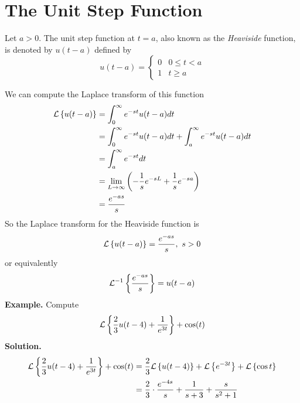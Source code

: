 \documentclass[openany]{report}
\begin{document}
\section{The Unit Step Function}

\begin{definition}
    Let $a > 0$. The unit step function at $t = a$, also known as the \emph{Heaviside} function, is denoted by $u(t-a)$ defined by 
    \[u(t-a) = \begin{cases}
        0 &  0 \leq t < a\\
        1 & t \geq a 
    \end{cases}\]
\end{definition}

We can compute the Laplace transform of this function 
\begin{align*}
    \mathcal{L}\left\{u(t-a)\right\} &= \int_0^\infty e^{-st} u(t-a) dt\\
    &= \int_0^\infty e^{-st}u(t-a)dt + \int_a^\infty e^{-st}u(t-a)dt\\
    &=\int_a^\infty e^{-st}dt\\
    &= \lim_{L\rightarrow\infty} \left(-\frac{1}{s}e^{-sL} + \frac{1}{s}e^{-sa}\right) \\
    &= \frac{e^{-as}}{s}
\end{align*}
So the Laplace transform for the Heaviside function is
\[\mathcal{L}\left\{u(t-a)\right\} = \frac{e^{-as}}{s}, \ s > 0\]
or equivalently 
\[\mathcal{L}^{-1}\left\{\frac{e^{-as}}{s}\right\} = u(t-a)\]
\textbf{Example.} Compute 
\[\mathcal{L}\left\{\frac{2}{3}u(t-4) + \frac{1}{e^{3t}}\right\}+\cos(t)\]
\textbf{Solution.} 
\begin{align*}
    \mathcal{L}\left\{\frac{2}{3}u(t-4) + \frac{1}{e^{3t}}\right\}+\cos(t) &= \frac{2}{3}\mathcal{L}\left\{u(t-4)\right\} + \mathcal{L}\left\{e^{-3t}\right\} + \mathcal{L}\left\{\cos t\right\}\\
    &= \frac{2}{3}\cdot \frac{e^{-4s}}{s} + \frac{1}{s + 3} + \frac{s}{s^2+1}
\end{align*}
\end{document}
